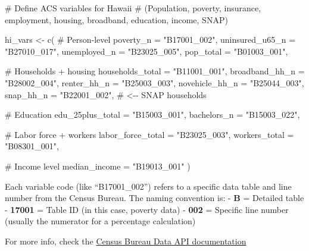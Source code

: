 \documentclass[
  letterpaper,
  DIV=11,
  numbers=noendperiod]{scrartcl}
\newenvironment{Shaded}{\begin{snugshade}}{\end{snugshade}}
\newcommand{\AttributeTok}[1]{\textcolor[rgb]{0.40,0.45,0.13}{#1}}
\newcommand{\CommentTok}[1]{\textcolor[rgb]{0.37,0.37,0.37}{#1}}
\newcommand{\FunctionTok}[1]{\textcolor[rgb]{0.28,0.35,0.67}{#1}}
\newcommand{\NormalTok}[1]{\textcolor[rgb]{0.00,0.23,0.31}{#1}}
\newcommand{\OtherTok}[1]{\textcolor[rgb]{0.00,0.23,0.31}{#1}}
\newcommand{\StringTok}[1]{\textcolor[rgb]{0.13,0.47,0.30}{#1}}
\begin{document}
\begin{Shaded}
\begin{Highlighting}[]
\CommentTok{\# Define ACS variables for Hawaii}
\CommentTok{\# (Population, poverty, insurance, employment, housing, broadband, education, income, SNAP)}

\NormalTok{hi\_vars }\OtherTok{\textless{}{-}} \FunctionTok{c}\NormalTok{(}
  \CommentTok{\# Person{-}level}
  \AttributeTok{poverty\_n            =} \StringTok{"B17001\_002"}\NormalTok{,}
  \AttributeTok{uninsured\_u65\_n      =} \StringTok{"B27010\_017"}\NormalTok{,}
  \AttributeTok{unemployed\_n         =} \StringTok{"B23025\_005"}\NormalTok{,}
  \AttributeTok{pop\_total            =} \StringTok{"B01003\_001"}\NormalTok{,}
  
  \CommentTok{\# Households + housing}
  \AttributeTok{households\_total     =} \StringTok{"B11001\_001"}\NormalTok{,}
  \AttributeTok{broadband\_hh\_n       =} \StringTok{"B28002\_004"}\NormalTok{,}
  \AttributeTok{renter\_hh\_n          =} \StringTok{"B25003\_003"}\NormalTok{,}
  \AttributeTok{novehicle\_hh\_n       =} \StringTok{"B25044\_003"}\NormalTok{,}
  \AttributeTok{snap\_hh\_n            =} \StringTok{"B22001\_002"}\NormalTok{,     }\CommentTok{\# \textless{}{-}{-} SNAP households}
  
  \CommentTok{\# Education}
  \AttributeTok{edu\_25plus\_total     =} \StringTok{"B15003\_001"}\NormalTok{,}
  \AttributeTok{bachelors\_n          =} \StringTok{"B15003\_022"}\NormalTok{,}
  
  \CommentTok{\# Labor force + workers}
  \AttributeTok{labor\_force\_total    =} \StringTok{"B23025\_003"}\NormalTok{,}
  \AttributeTok{workers\_total        =} \StringTok{"B08301\_001"}\NormalTok{,}
  
  \CommentTok{\# Income level}
  \AttributeTok{median\_income        =} \StringTok{"B19013\_001"}
\NormalTok{)}
\end{Highlighting}
\end{Shaded}

\begin{tcolorbox}[enhanced jigsaw, title=\textcolor{quarto-callout-note-color}{\faInfo}\hspace{0.5em}{Understanding Census Variables}, titlerule=0mm, coltitle=black, colbacktitle=quarto-callout-note-color!10!white, colback=white, left=2mm, toprule=.15mm, opacitybacktitle=0.6, toptitle=1mm, colframe=quarto-callout-note-color-frame, bottomtitle=1mm, arc=.35mm, bottomrule=.15mm, breakable, leftrule=.75mm, opacityback=0, rightrule=.15mm]

Each variable code (like ``B17001\_002'') refers to a specific data
table and line number from the Census Bureau. The naming convention is:
- \textbf{B} = Detailed table - \textbf{17001} = Table ID (in this case,
poverty data) - \textbf{002} = Specific line number (usually the
numerator for a percentage calculation)

For more info, check the
\href{https://api.census.gov/data/2023/acs/acs5/variables.html}{Census
Bureau Data API documentation}

\end{tcolorbox}
\end{document}
